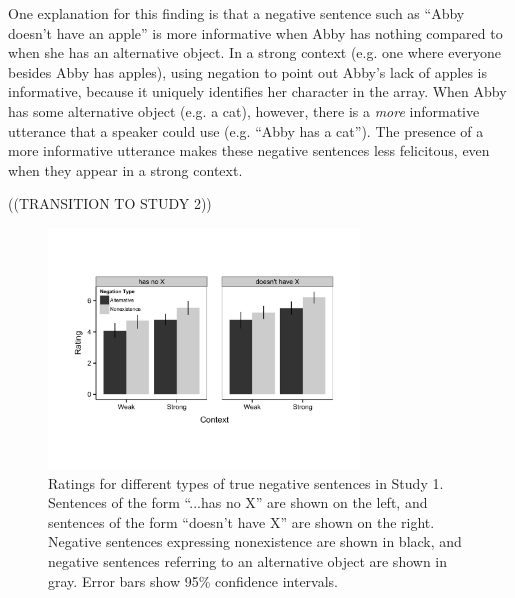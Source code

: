 \documentclass[10pt,letterpaper]{article}
\begin{document}
One explanation for this finding is that a negative sentence such as ``Abby doesn't have an apple'' is more informative when Abby has nothing compared to when she has an alternative object.  In a strong context (e.g. one where everyone besides Abby has apples), using negation to point out Abby's lack of apples is informative, because it uniquely identifies her character in the array.  When Abby has some alternative object (e.g. a cat), however, there is a \emph{more} informative utterance that a speaker could use (e.g. ``Abby has a cat'').  The presence of a more informative utterance makes these negative sentences less felicitous, even when they appear in a strong context.


((TRANSITION TO STUDY 2))


\begin{figure}
\begin{center} 
\includegraphics[width=3.25in]{figures/study1.pdf}
\caption{\label{fig:s1} Ratings for different types of true negative sentences in Study 1.  Sentences of the form ``...has no X'' are shown on the left, and sentences of the form ``doesn't have X'' are shown on the right.  Negative sentences expressing nonexistence are shown in black, and negative sentences referring to an alternative object are shown in gray.  Error bars show 95\% confidence intervals.}
\end{center} 
\end{figure}
\end{document}
